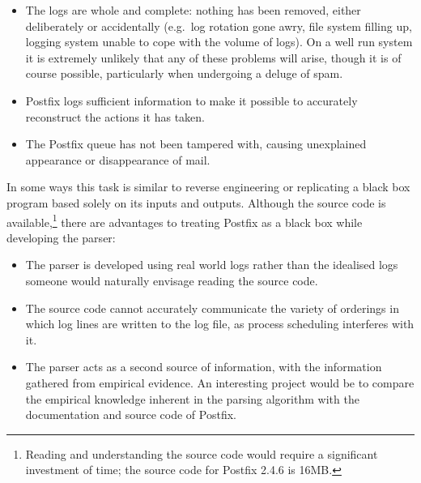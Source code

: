 \documentclass[a4paper,12pt,draft]{article}
\begin{document}
\begin{itemize}

    \item The logs are whole and complete: nothing has been removed, either
        deliberately or accidentally (e.g.\ log rotation gone awry, file
        system filling up, logging system unable to cope with the volume of
        logs).  On a well run system it is extremely unlikely that any of
        these problems will arise, though it is of course possible,
        particularly when undergoing a deluge of spam.

    \item Postfix logs sufficient information to make it possible to
        accurately reconstruct the actions it has taken.

    \item The Postfix queue has not been tampered with, causing unexplained
        appearance or disappearance of mail.

\end{itemize}

In some ways this task is similar to reverse engineering or replicating a
black box program based solely on its inputs and outputs.  Although the
source code is available,\footnote{Reading and understanding the source
code would require a significant investment of time; the source code for
Postfix 2.4.6 is 16MB.} there are advantages to treating Postfix as a black
box while developing the parser:

\begin{itemize}

    \item The parser is developed using real world logs rather than the
        idealised logs someone would naturally envisage reading the source
        code.

    \item The source code cannot accurately communicate the variety of
        orderings in which log lines are written to the log file, as
        process scheduling interferes with it.

    \item The parser acts as a second source of information, with the
        information gathered from empirical evidence.  An interesting
        project would be to compare the empirical knowledge inherent in the
        parsing algorithm with the documentation and source code of
        Postfix.

\end{itemize}
\end{document}
